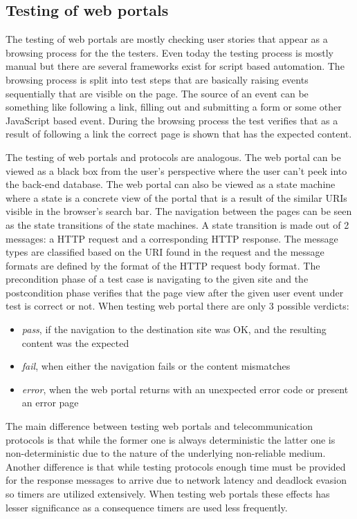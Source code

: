 \documentclass[a4paper]{article}
\begin{document}
\subsection{Testing of web portals}

The testing of web portals are mostly checking user stories that appear as a browsing process for the the testers. Even
today the testing process is mostly manual but there are several frameworks exist for script based automation. The
browsing process is split into test steps that are basically raising events sequentially that are visible on the page.
The source of an event can be something like following a link, filling out and submitting a form or some other
JavaScript based event. During the browsing process the test verifies that as a result of following a link the correct
page is shown that has the expected content.

The testing of web portals and protocols are analogous. The web portal can be viewed as a black box from the user's
perspective where the user can't peek into the back-end database. The web portal can also be viewed as a state machine
where a state is a concrete view of the portal that is a result of the similar URIs visible in the browser's search
bar. The navigation between the pages can be seen as the state transitions of the state machines. A state transition is
made out of 2 messages: a HTTP request and a corresponding HTTP response. The message types are classified based on the
URI found in the request and the message formats are defined by the format of the HTTP request body format. The
precondition phase of a test case is navigating to the given site  and the postcondition phase verifies that the page
view after the given user event under test is correct or not.
When testing web portal there are only 3 possible verdicts:
\begin{itemize}
    \item \emph{pass}, if the navigation to the destination site was OK, and the resulting content was the expected
    \item \emph{fail}, when either the navigation fails or the content mismatches
    \item \emph{error}, when the web portal returns with an unexpected error code or present an error page
\end{itemize}

The main difference between testing web portals and telecommunication protocols is that while the former one is always
deterministic the latter one is non-deterministic due to the nature of the underlying non-reliable medium. Another
difference is that while testing protocols enough time must be provided for the response messages to arrive due to
network latency and deadlock evasion so timers are utilized extensively. When testing web portals these effects has
lesser significance as a consequence timers are used less frequently.
\end{document}
